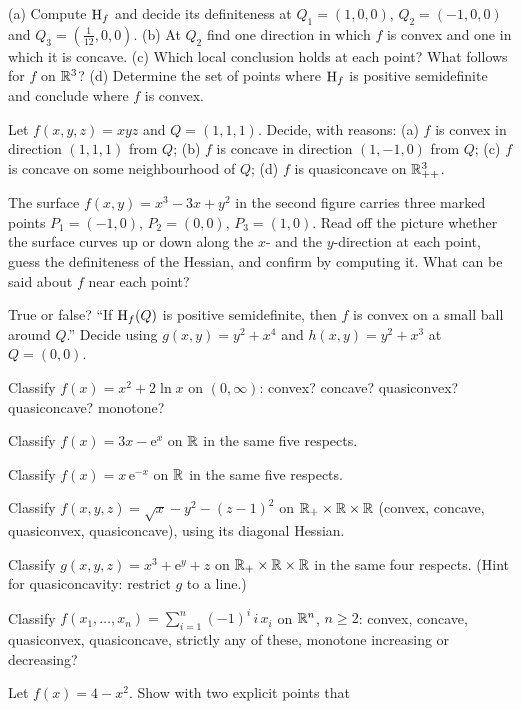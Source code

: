 \begin{problems}
        (a) Compute $\operatorname{H}_f$ and decide its definiteness at
        $Q_1=(1,0,0)$, $Q_2=(-1,0,0)$ and $Q_3=(\tfrac1{12},0,0)$.
        (b) At $Q_2$ find one direction in which $f$ is convex and one in
        which it is concave.
        (c) Which local conclusion holds at each point? What follows for
        $f$ on $\mathbb{R}^{3}$?
        (d) Determine the set of points where $\operatorname{H}_f$ is positive
        semidefinite and conclude where $f$ is convex.
  \item Let $f(x,y,z)=xyz$ and $Q=(1,1,1)$. Decide, with reasons:
        (a) $f$ is convex in direction $(1,1,1)$ from $Q$;
        (b) $f$ is concave in direction $(1,-1,0)$ from $Q$;
        (c) $f$ is concave on some neighbourhood of $Q$;
        (d) $f$ is quasiconcave on $\mathbb{R}^{3}_{++}$.
  \item The surface $f(x,y)=x^{3}-3x+y^{2}$ in the second figure carries
        three marked points $P_1=(-1,0)$, $P_2=(0,0)$, $P_3=(1,0)$. Read
        off the picture whether the surface curves up or down along the
        $x$- and the $y$-direction at each point, guess the definiteness of
        the Hessian, and confirm by computing it. What can be said about
        $f$ near each point?
  \item True or false? ``If $\operatorname{H}_f(Q)$ is positive semidefinite, then $f$
        is convex on a small ball around $Q$.'' Decide using
        $g(x,y)=y^{2}+x^{4}$ and $h(x,y)=y^{2}+x^{3}$ at $Q=(0,0)$.
  \item Classify $f(x)=x^{2}+2\ln x$ on $(0,\infty)$: convex? concave?
        quasiconvex? quasiconcave? monotone?
  \item Classify $f(x)=3x-\mathrm{e}^{x}$ on $\mathbb{R}$ in the same five
        respects.
  \item Classify $f(x)=x\,\mathrm{e}^{-x}$ on $\mathbb{R}$ in the same five
        respects.
  \item Classify $f(x,y,z)=\sqrt{x}-y^{2}-(z-1)^{2}$ on
        $\mathbb{R}_{+}\times\mathbb{R}\times\mathbb{R}$ (convex, concave, quasiconvex,
        quasiconcave), using its diagonal Hessian.
  \item Classify $g(x,y,z)=x^{3}+\mathrm{e}^{y}+z$ on
        $\mathbb{R}_{+}\times\mathbb{R}\times\mathbb{R}$ in the same four respects.
        (Hint for quasiconcavity: restrict $g$ to a line.)
  \item Classify $f(x_1,\dots,x_n)=\sum_{i=1}^{n}(-1)^{i}\,i\,x_i$ on
        $\mathbb{R}^{n}$, $n\ge2$: convex, concave, quasiconvex, quasiconcave,
        strictly any of these, monotone increasing or decreasing?
  \item Let $f(x)=4-x^{2}$. Show with two explicit points that

\end{problems}
